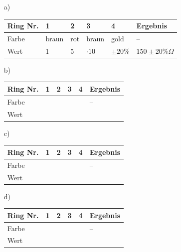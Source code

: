 \begin{minipage}{0.7\textwidth}
\begin{itemize}
\item[a)] 
\begin{tabular}{|p{}|p{}|p{}|p{}|p{}|p{}|}\hline 
\rowcolor{lightgray} Ring Nr.      & 1 & 2 & 3 & 4  & Ergebnis \\\hline 
Farbe   & braun & rot &  braun & gold & -- \\\hline
Wert     &  1        & 5    & $\cdot 10$ & $\pm 20\%$ & $150\pm20\%\Omega$ \\\hline 
\end{tabular}
\item[b)]
\begin{tabular}{|p{}|p{}|p{}|p{}|p{}|p{}|}\hline 
\rowcolor{lightgray} Ring Nr.      & 1 & 2 & 3 & 4  & Ergebnis \\\hline 
Farbe   &  \qquad& \qquad&  \qquad & \qquad & -- \\\hline
Wert     &          &    & & & \\\hline
\end{tabular}

\item[c)]
\begin{tabular}{|p{}|p{}|p{}|p{}|p{}|p{}|}\hline 
\rowcolor{lightgray} Ring Nr.      & 1 & 2 & 3 & 4  & Ergebnis \\\hline 
Farbe   &  \qquad& \qquad&  \qquad & \qquad & -- \\\hline
Wert     &          &    & & & \\\hline
\end{tabular}

\item[d)]
\begin{tabular}{|p{}|p{}|p{}|p{}|p{}|p{}|}\hline 
\rowcolor{lightgray} Ring Nr.      & 1 & 2 & 3 & 4  & Ergebnis \\\hline 
Farbe   &  \qquad& \qquad&  \qquad & \qquad & -- \\\hline
Wert     &          &    & & & \\\hline
\end{tabular}

\end{itemize}

\end{minipage}


